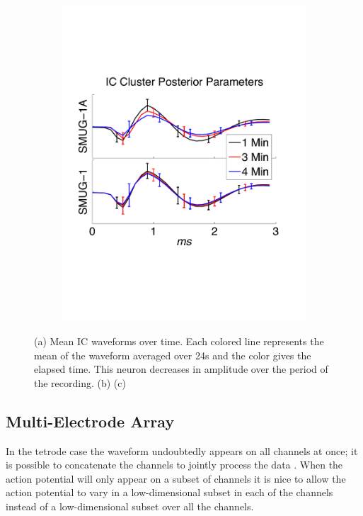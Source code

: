 \begin{center}
\begin{figure}
\begin{subfigure}[b]{.33\textwidth}
\includegraphics[width=\textwidth]{../figs/new/ARvsStationary.pdf}
\caption{}
\label{truewaveforms}
\end{subfigure}
\caption{
(a) Mean IC waveforms over time.  Each colored line represents the mean of the waveform averaged over 24s and the color gives the elapsed time.  This neuron decreases in amplitude over the period of the recording. 
(b) 
(c) }
\end{figure}
\end{center}

\subsection{Multi-Electrode Array} \label{sub:multi}

In the tetrode case the waveform undoubtedly appears on all channels at once; it is possible to concatenate the channels to jointly process the data \cite{wood2009}.  When the action potential will only appear on a subset of channels it is nice to allow the action potential to vary in a low-dimensional subset in each of the channels instead of a low-dimensional subset over all the channels. \cite{Prentice2011}

